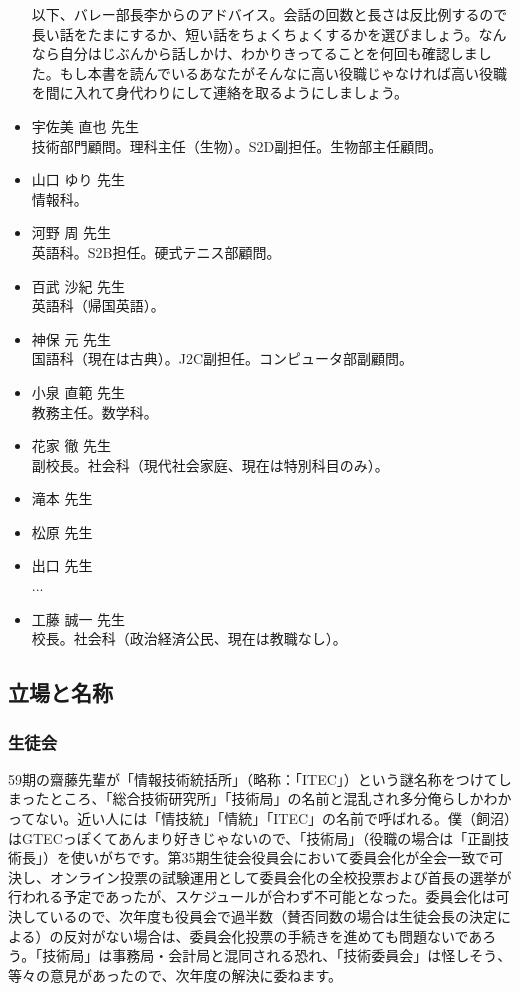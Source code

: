 \documentclass[dvipdfmx,jb5]{jarticle}
\begin{document}
\begin{itemize}
  以下、バレー部長李からのアドバイス。会話の回数と長さは反比例するので長い話をたまにするか、短い話をちょくちょくするかを選びましょう。なんなら自分はじぶんから話しかけ、わかりきってることを何回も確認しました。もし本書を読んでいるあなたがそんなに高い役職じゃなければ高い役職を間に入れて身代わりにして連絡を取るようにしましょう。

  \item 宇佐美 直也 先生\\
  技術部門顧問。理科主任（生物）。S2D副担任。生物部主任顧問。
  \item 山口 ゆり 先生\\
  情報科。
  \item 河野 周 先生\\
  英語科。S2B担任。硬式テニス部顧問。
  \item 百武 沙紀 先生\\
  英語科（帰国英語）。
  \item 神保 元 先生\\
  国語科（現在は古典）。J2C副担任。コンピュータ部副顧問。
  \item 小泉 直範 先生\\
  教務主任。数学科。
  \item 花家 徹 先生\\
  副校長。社会科（現代社会家庭、現在は特別科目のみ）。
  \item 滝本 先生\\
  \item 松原 先生\\
  \item 出口 先生\\
  ...
  \item 工藤 誠一 先生\\
  校長。社会科（政治経済公民、現在は教職なし）。
\end{itemize}

\subsection{立場と名称}
\subsubsection{生徒会}
59期の齋藤先輩が「情報技術統括所」（略称：「ITEC」）という謎名称をつけてしまったところ、「総合技術研究所」「技術局」の名前と混乱され多分俺らしかわかってない。近い人には「情技統」「情統」「ITEC」の名前で呼ばれる。僕（飼沼）はGTECっぽくてあんまり好きじゃないので、「技術局」（役職の場合は「正副技術長」）を使いがちです。第35期生徒会役員会において委員会化が全会一致で可決し、オンライン投票の試験運用として委員会化の全校投票および首長の選挙が行われる予定であったが、スケジュールが合わず不可能となった。委員会化は可決しているので、次年度も役員会で過半数（賛否同数の場合は生徒会長の決定による）の反対がない場合は、委員会化投票の手続きを進めても問題ないであろう。「技術局」は事務局・会計局と混同される恐れ、「技術委員会」は怪しそう、等々の意見があったので、次年度の解決に委ねます。
\end{document}
